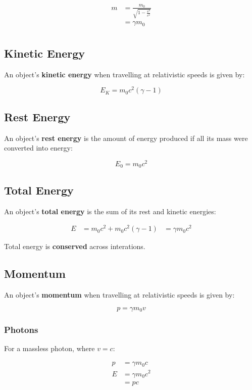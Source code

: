\documentclass[a4paper,11pt]{report}
\begin{document}
$$
\begin{aligned}
m & = \frac{m_0}{\sqrt{1 - \frac{v^2}{c^2}}} \\
& = \gamma m_0 \\
\end{aligned}
$$

\subsection{Kinetic Energy}

An object's \textbf{kinetic energy} when travelling at relativistic speeds is
given by:

$$
E_K = m_0 c^2 (\gamma - 1)
$$

\subsection{Rest Energy}

An object's \textbf{rest energy} is the amount of energy produced if all its
mass were converted into energy:

$$
E_0 = m_0 c^2
$$

\subsection{Total Energy}

An object's \textbf{total energy} is the sum of its rest and kinetic energies:

$$
\begin{aligned}
E & = m_0 c^2 + m_0 c^2 (\gamma - 1)
& = \gamma m_0 c^2
\end{aligned}
$$

Total energy is \textbf{conserved} across interations.

\subsection{Momentum}

An object's \textbf{momentum} when travelling at relativistic speeds is given
by:

$$
p = \gamma m_0 v
$$

\subsubsection{Photons}

For a massless photon, where $v = c$:

$$
\begin{aligned}
p & = \gamma m_0 c \\
E & = \gamma m_0 c^2 \\
& = pc \\
\end{aligned}
$$
\end{document}
